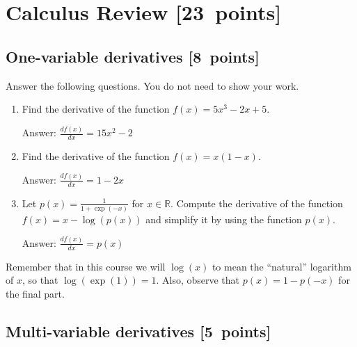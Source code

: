 \documentclass{article}
\newcommand{\blu}[1]{{\textcolor{blu}{#1}}}
\newcommand{\gre}[1]{\textcolor{gre}{#1}}
\newcommand\ans[1]{\par\gre{Answer: #1}}
\let\ask\blu
\newcommand\pts[1]{\textcolor{pointscolour}{[#1~points]}}
\def\R{\mathbb{R}}
\begin{document}
  \newpage

  \clearpage\section{Calculus Review \pts{23}}



  \subsection{One-variable derivatives \pts{8}}
  \label{sub.one.var}

  \ask{Answer the following questions.} You do not need to show your work.

  \begin{enumerate}
  \item Find the derivative of the function $f(x) = 5x^3 -2x + 5$.
  \ans{$\frac{df(x)}{dx} = 15x^2-2$}
  \item Find the derivative of the function $f(x) = x(1-x)$.
  \ans{$\frac{df(x)}{dx} = 1-2x$}
  \item Let $p(x) = \frac{1}{1+\exp(-x)}$ for $x \in \R$. Compute the derivative of the function $f(x) = x-\log(p(x))$ and simplify it by using the function $p(x)$.
  \ans{$\frac{df(x)}{dx} = p(x)$}
  \end{enumerate}
  Remember that in this course we will $\log(x)$ to mean the ``natural'' logarithm of $x$, so that $\log(\exp(1)) = 1$. Also, observe that $p(x) = 1-p(-x)$ for the final part.

  \newpage
  
  \subsection{Multi-variable derivatives \pts{5}}
  \label{sub.multi.var}
\end{document}
